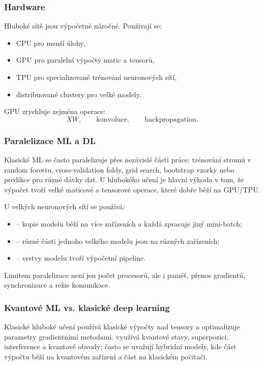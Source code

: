 \subsubsection{Hardware}

Hluboké sítě jsou výpočetně náročné. Používají se:
\begin{itemize}
    \item CPU pro menší úlohy,
    \item GPU pro paralelní výpočty matic a tensorů,
    \item TPU pro specializované trénování neuronových sítí,
    \item distribuované clustery pro velké modely.
\end{itemize}

GPU zrychluje zejména operace:
\[
XW,
\qquad
\text{konvoluce},
\qquad
\text{backpropagation}.
\]

\subsubsection{Paralelizace ML a DL}
Klasické ML se často paralelizuje přes nezávislé části práce: trénování stromů v random forestu,
cross-validation foldy, grid search, bootstrap vzorky nebo predikce pro různé dávky dat. U hlubokého
učení je hlavní výhoda v tom, že výpočet tvoří velké maticové a tensorové operace, které dobře běží
na GPU/TPU.

U velkých neuronových sítí se používá:
\begin{itemize}
    \item {} -- kopie modelu běží na více zařízeních a každá zpracuje jiný
    mini-batch;
    \item {} -- různé části jednoho velkého modelu jsou na různých zařízeních;
    \item {} -- vrstvy modelu tvoří výpočetní pipeline.
\end{itemize}

Limitem paralelizace není jen počet procesorů, ale i paměť, přenos gradientů, synchronizace a režie
komunikace.

\subsubsection{Kvantové ML vs. klasické deep learning}
Klasické hluboké učení používá klasické výpočty nad tensory a optimalizuje parametry gradientními
metodami.  využívá kvantové stavy, superpozici, interference a kvantové
obvody; často se uvažují hybridní modely, kde část výpočtu běží na kvantovém zařízení a část na klasickém
počítači.

